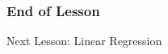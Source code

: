 \documentclass[xcolor=dvipsnames]{beamer}
\begin{document}





\begin{frame}
  \frametitle{End of Lesson}
Next Lesson: Linear Regression
\end{frame}
\end{document}
